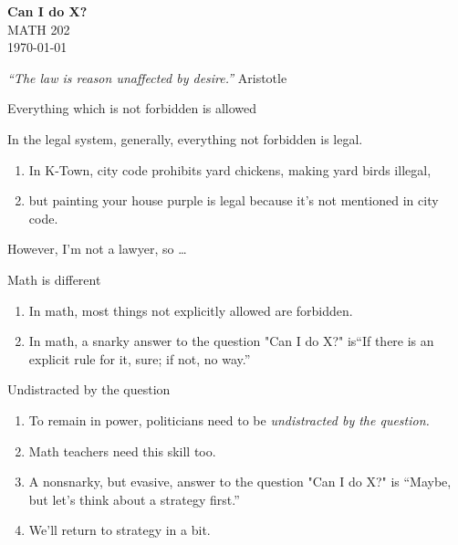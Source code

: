 \documentclass[portrait,fleqn,12pt]{beamer}
\newenvironment{handlist}
   {\begin{enumerate}[\faHandPointRight]
       \addtolength{\itemsep}{0.0\itemsep}}
     {\end{enumerate}}
\begin{document}
\begin{frame}
\begin{flushleft} 
\textbf{Can I do X?} \\
MATH 202 \\
\today 
\end{flushleft}


\emph{“The law is reason unaffected by desire.”} \hfill {\sc Aristotle } 
\end{frame}


\begin{frame}[fragile]{Everything which is not forbidden is allowed}

In the legal system, generally, everything not forbidden is legal.  

\begin{handlist}
 \item In K-Town, city code prohibits yard chickens, making  yard birds illegal, 
 
 \item but painting your house purple is legal because it's not mentioned in city code.
 \end{handlist}
 
 However, I'm not a lawyer, so \dots
\end{frame}
 
\begin{frame}{Math is different}
 
\begin{handlist}
\item[\faHandPointRight] In math, most things not explicitly allowed are forbidden.
\item[\faHandPointRight] In math, a snarky answer to the question "Can I do X?"  is``If there is an explicit  rule for it, sure; if not, no way.''
\end{handlist}
 \vfill
\end{frame}

\begin{frame}{Undistracted by the question}

\begin{handlist}
\item To remain in power, politicians need to be \emph{undistracted by the question.}

\item Math teachers need this skill too.

\item A nonsnarky, but evasive,  answer to the question  "Can I do X?" is ``Maybe, but let's think about a strategy first.'' 

\item We'll return to strategy in a bit.
\end{handlist}
\end{frame}
\end{document}
